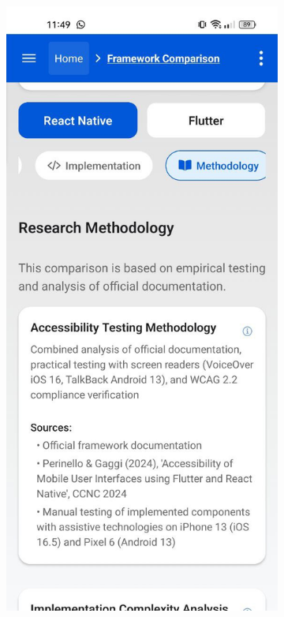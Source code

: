 \begin{figure}[ht]
\begin{subfigure}[b]{0.48\textwidth}
        \includegraphics[width=\linewidth, alt={Methodology tab of the Framework Comparison screen}]{img/methodology1.jpg}

\end{subfigure}
\end{figure}
